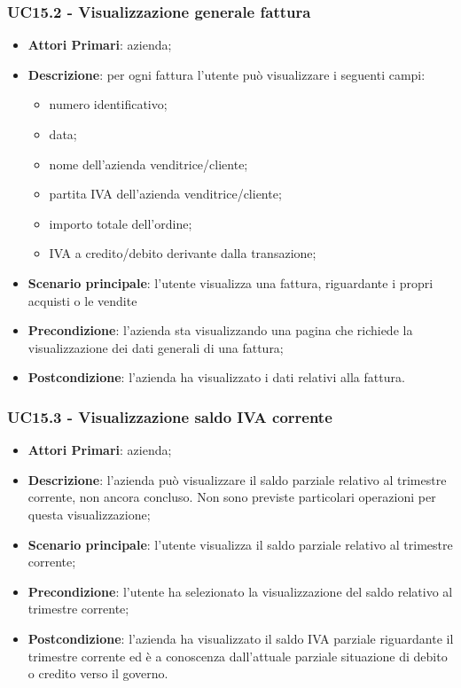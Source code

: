 \subsubsection{UC15.2 - Visualizzazione generale fattura}
\begin{itemize}
	\item \textbf{Attori Primari}: azienda;
	\item \textbf{Descrizione}: per ogni fattura l'utente può visualizzare i seguenti campi:
	\begin{itemize}
		\item numero identificativo;
		\item data;
		\item nome dell'azienda venditrice/cliente;
		\item partita IVA dell'azienda venditrice/cliente;
		\item importo totale dell'ordine;
		\item IVA a credito/debito derivante dalla transazione;
	\end{itemize}
	\item \textbf{Scenario principale}: l'utente visualizza una fattura, riguardante i propri  acquisti o le vendite
	\item \textbf{Precondizione}: l'azienda sta visualizzando una pagina che richiede la visualizzazione dei dati generali di una fattura;
	\item \textbf{Postcondizione}: l'azienda ha visualizzato i dati relativi alla fattura.
\end{itemize}


\subsubsection{UC15.3 - Visualizzazione saldo IVA corrente}
\begin{itemize}
	\item \textbf{Attori Primari}: azienda;
	\item \textbf{Descrizione}: l'azienda può visualizzare il saldo parziale relativo al trimestre corrente, non ancora concluso. Non sono previste particolari operazioni per questa visualizzazione;
	\item \textbf{Scenario principale}: l'utente visualizza il saldo parziale relativo al trimestre corrente;
	\item \textbf{Precondizione}: l'utente ha selezionato la visualizzazione del saldo relativo al trimestre corrente;
	\item \textbf{Postcondizione}: l'azienda ha visualizzato il saldo IVA parziale riguardante il trimestre corrente ed è a conoscenza dall'attuale parziale situazione di debito o credito verso il governo.
\end{itemize} 

